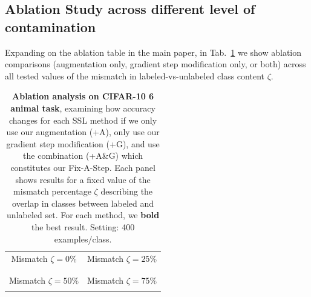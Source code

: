 \subsection{Ablation Study across different level of contamination}

Expanding on the ablation table in the main paper, in Tab.~\ref{tab:results_cifar10_ablation_all_zeta} we show ablation comparisons (augmentation only, gradient step modification only, or both) across all tested values of the mismatch in labeled-vs-unlabeled class content $\zeta$.

\begin{table}[!h]
	\setlength{\tabcolsep}{.08cm}
    \begin{tabular}{c c}
		{\large Mismatch $\zeta=0\%$}
		&
		{\large Mismatch $\zeta=25\%$}
		\\
		\begin{minipage}{.5\textwidth}
		\resizebox{\textwidth}{!}{%
				
		}
		\end{minipage}
		&
		\begin{minipage}{.5\textwidth}
		\resizebox{\textwidth}{!}{%
				
		}
		\end{minipage}
		\\ %
		\\ %
		{\large Mismatch $\zeta=50\%$}
		&
		{\large Mismatch $\zeta=75\%$}
		\\
		\begin{minipage}{.5\textwidth}
		\resizebox{\textwidth}{!}{%
				
		}
		\end{minipage}
		&
		\begin{minipage}{.5\textwidth}
		\resizebox{\textwidth}{!}{%
				
		}
		\end{minipage}
	\end{tabular}
	\caption{\textbf{Ablation analysis on CIFAR-10 6 animal task}, examining how accuracy changes for each SSL method if we only use our augmentation (+A), only use our gradient step modification (+G), and use the combination (+A\&G) which constitutes our Fix-A-Step. 
	Each panel shows results for a fixed value of the mismatch percentage $\zeta$ describing the overlap in classes between labeled and unlabeled set.
    For each method, we \textbf{bold} the best result.
    Setting: 400 examples/class.
    }%
\label{tab:results_cifar10_ablation_all_zeta}
\end{table}


